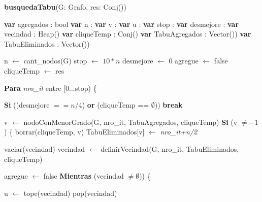 \textbf{busquedaTabu}(G: Grafo, res: Conj(\entero)) \\
\begin{algorithm}[H]
\footnotesize 
\linesnumbered
\incmargin{3em}

	\BlankLine
	\textbf{var} agregados 		: bool		 													
	\textbf{var} n 				: \entero														{}
	\textbf{var} v 				: \entero														{}
	\textbf{var} u 				: \entero														{}
	\textbf{var} stop				: \entero							 							{}
	\textbf{var} desmejore		: \entero														{}
	\textbf{var} vecindad 		: Heap(\entero)									 			
	\textbf{var} cliqueTemp 		: Conj(\entero) 												
	\textbf{var} TabuAgregados 	: Vector(\entero))											 	
	\textbf{var} TabuEliminados 	: Vector(\entero)) 												
	
	\BlankLine \BlankLine
	n 				$\leftarrow$ cant\_nodos(G)													
	stop 			$\leftarrow$ $10*n$															
	desmejore 		$\leftarrow$ 0																
	agregue 		$\leftarrow$ false																
	cliqueTemp 	$\leftarrow$ res																
	

	\BlankLine \BlankLine		
	\textbf{Para} \textit{nro\_it} entre [0...stop) \{ 												

	\BlankLine	
	\tab \textbf{Si} ((desmejore $== n/4$) \textbf{or} (cliqueTemp == $\emptyset$))		
	\tab \tab \textbf{break}																		

	\BlankLine \BlankLine				
	\tab v $\leftarrow$ nodoConMenorGrado(G, nro\_it, TabuAgregados, cliqueTemp)				
	\tab \textbf{Si} (v $\neq -1$) \{																
	\tab \tab borrar(cliqueTemp, v) 																	
	\tab \tab TabuEliminados[v] $\leftarrow$ \textit{nro\_it+n/2}			 					

	\BlankLine \BlankLine		
	\tab \tab vaciar(vecindad)																	
	\tab \tab vecindad $\leftarrow$ definirVecindad(G, nro\_it, TabuEliminados, cliqueTemp)	 	

	\BlankLine \BlankLine		
	\tab \tab agregue $\leftarrow$ false														
	\tab \tab \textbf{Mientras} (vecindad $\neq \emptyset$)) \{								

	\BlankLine
	\tab \tab \tab u $\leftarrow$ tope(vecindad)												
	\tab \tab \tab pop(vecindad)																	


\end{algorithm}
